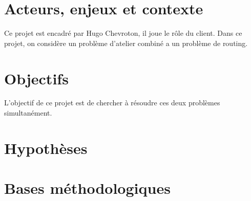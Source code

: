 \section{Acteurs, enjeux et contexte}
Ce projet est encadré par Hugo Chevroton, il joue le rôle du client.
Dans ce projet, on considère un problème d'atelier combiné a un problème de routing.

\section{Objectifs}
L'objectif de ce projet est de chercher à résoudre ces deux problèmes simultanément.
\section{Hypothèses}
\section{Bases méthodologiques}